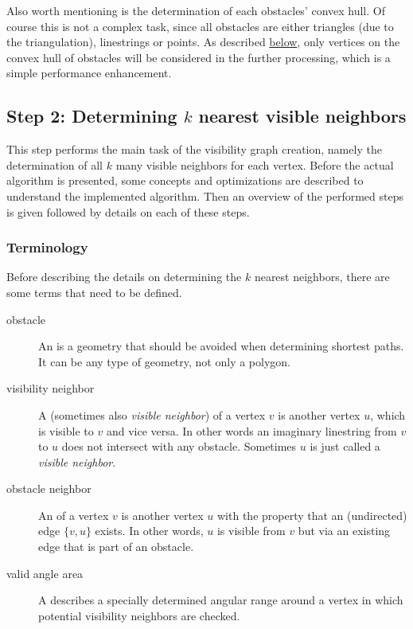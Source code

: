 		Also worth mentioning is the determination of each obstacles' convex hull.
		Of course this is not a complex task, since all obstacles are either triangles (due to the triangulation), linestrings or points.
		As described \hyperref[subsubsec:convex-hull]{below}, only vertices on the convex hull of obstacles will be considered in the further processing, which is a simple performance enhancement.
			
	\subsection{Step 2: Determining $k$ nearest visible neighbors}
	\label{subsec:step-2-knn-search}
			
		This step performs the main task of the visibility graph creation, namely the determination of all $k$ many visible neighbors for each vertex.
		Before the actual algorithm is presented, some concepts and optimizations are described to understand the implemented algorithm.
		Then an overview of the performed steps is given followed by details on each of these steps.
		
		\subsubsection{Terminology}
		
			Before describing the details on determining the $k$ nearest neighbors, there are some terms that need to be defined.
			
			\begin{description}
				\item[obstacle] An  is a geometry that should be avoided when determining shortest paths. It can be any type of geometry, not only a polygon.
				\item[visibility neighbor] A  (sometimes also \emph{visible neighbor}) of a vertex $v$ is another vertex $u$, which is visible to $v$ and vice versa. In other words an imaginary linestring from $v$ to $u$ does not intersect with any obstacle. Sometimes $u$ is just called a \emph{visible neighbor}.
				\item[obstacle neighbor] An  of a vertex $v$ is another vertex $u$ with the property that an (undirected) edge $\{v, u\}$ exists. In other words, $u$ is visible from $v$ but via an existing edge that is part of an obstacle.
				\item[valid angle area] A  describes a specially determined angular range around a vertex in which potential visibility neighbors are checked.
			\end{description}
		
